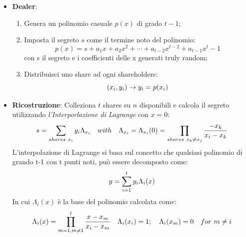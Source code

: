 \documentclass{book}
\theoremstyle{definition}
\begin{document}
\begin{itemize}
    \item \textbf{Dealer}:\
          \begin{enumerate}
              \item Genera un polinomio casuale \(p(x)\) di grado \(t-1\);
              \item Imposta il segreto \(s\) come il termine noto del polinomio:
                    \begin{equation*}
                        p(x)=s+a_{1}x+a_{2}x^{2}+ \cdots +a_{t-2}x^{t-2}+a_{t-1}x^t-1
                    \end{equation*}
                    con s il segreto e i coefficienti delle x generati truly random;
              \item Distribuisci uno share ad ogni shareholders:
                    \begin{equation*}
                        \centering
                        (x_{i},y_{i})\rightarrow y_{i}=p(x_{i})
                    \end{equation*}
          \end{enumerate}
    \item \textbf{Ricostruzione}: Colleziona \(t\) shares su \(n\) disponibili e calcola il segreto utilizzando \emph{l'Interporlazione di Lagrange} con \(x=0\):
          \begin{equation*}
              \centering
              s=\sum_{shares\ x_i}{y_{i}\Lambda_{x_{i}}}\quad with\quad\Lambda_{x_{i}}=\Lambda_{x_{i}}(0)=\prod_{shares\ x_{k}\neq x_{j}}{\frac{-x_{k}}{x_{i}-x_{k}}}
          \end{equation*}
          L'interpolazione di Lagrange si basa sul concetto che qualsiasi polinomio di grando t-1 con t punti noti, può essere decomposto come:
          \begin{equation*}
              \centering
              y=\sum_{i=1}^{t}{y_{i}\Lambda_{i}(x)}
          \end{equation*}
          In cui \(\Lambda_{i}(x)\) è la base del polinomio calcolata come:
          \begin{equation*}
              \centering
              \Lambda_{i}(x)=\prod_{m=1,m\neq1}^{l}{\frac{x-x_{m}}{x_{i}-x_{m}}}\quad \Lambda_{i}(x_{i})=1;\quad \Lambda_{i}(x_{m})=0\quad for\ m\neq i
          \end{equation*}
\end{itemize}
\end{document}
